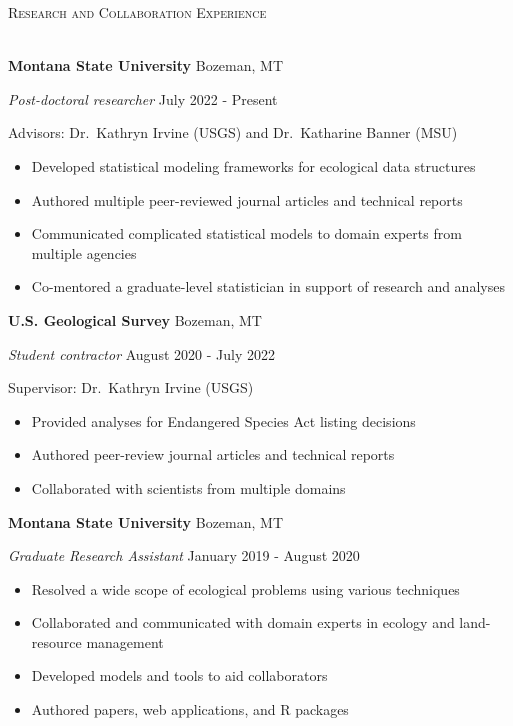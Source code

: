 \documentclass[a4paper]{article}
\newcommand{\lineunder} {
	\vspace*{-8pt} \\
	\hspace*{-18pt} \hrulefill \\
}
\newcommand{\header} [1] {
	{\hspace*{-18pt}\vspace*{6pt} \textcolor{Cerulean}{\textsc{#1}}}
	\vspace*{-6pt} \textcolor{Cerulean}{\lineunder}
}
\begin{document}
\header{Research and Collaboration Experience}
\vspace*{2mm}

\textbf{Montana State University} \hfill Bozeman, MT

\textit{Post-doctoral researcher} \hfill July 2022 - Present

Advisors: Dr.~Kathryn Irvine (USGS) and Dr.~Katharine Banner (MSU)

\vspace{-1mm}
\begin{itemize} \itemsep 1pt
    \item Developed statistical modeling frameworks for ecological data structures
    \item Authored multiple peer-reviewed journal articles and technical reports
    \item Communicated complicated statistical models to domain experts from multiple agencies
    \item Co-mentored a graduate-level statistician in support of research and analyses
\end{itemize}

\textbf{U.S. Geological Survey} \hfill Bozeman, MT

\textit{Student contractor} \hfill August 2020 - July 2022

Supervisor: Dr.~Kathryn Irvine (USGS)

\vspace{-1mm}
\begin{itemize} \itemsep 1pt
   \item Provided analyses for Endangered Species Act listing decisions
   \item Authored peer-review journal articles and technical reports
   \item Collaborated with scientists from multiple domains 
\end{itemize}

\textbf{Montana State University} \hfill Bozeman, MT

\textit{Graduate Research Assistant} \hfill January 2019 - August 2020

\vspace{-1mm}
\begin{itemize} \itemsep 1pt
   \item Resolved a wide scope of ecological problems using various techniques
   \item Collaborated and communicated with domain experts in ecology and land-resource management
   \item Developed models and tools to aid collaborators
   \item Authored papers, web applications, and R packages
\end{itemize}
\end{document}
